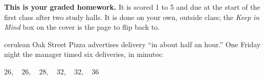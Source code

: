 \documentclass[12pt]{article}
\begin{document}

\vspace{0.04in}

\begin{remindbox}
\small
\textbf{This is your graded homework.} It is scored 1 to 5 and due
at the start of the first class after two study halls. It is done on your own, outside class;
the \emph{Keep in Mind} box on the cover is the page to flip back to.
\end{remindbox}

\vspace{0.03in}

\boxguard[20]
\begin{scenariobox}{cerulean}
Oak Street Pizza advertises delivery ``in about half an hour.'' One Friday night the manager
timed six deliveries, in minutes:

\vspace{2pt}
\centerline{$26,\quad 26,\quad 28,\quad 32,\quad 32,\quad 36$}
\end{scenariobox}

\vspace{0.03in}
\end{document}
